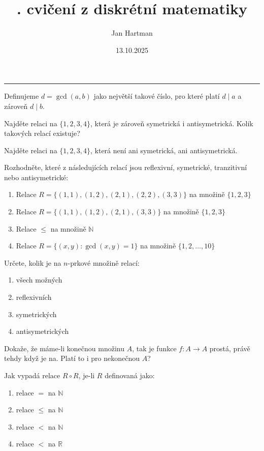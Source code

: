 \documentclass[10pt]{article}
\title{\tutnum. cvičení z diskrétní matematiky}
\author{Jan Hartman}
\date{13.10.2025}
\newcommand{\titlerule}{%
    \noindent %
    \makebox[\textwidth]{\large \thetitle \hfill \thedate}
    \rule{\textwidth}{0.4pt}%
}
\begin{document}
\titlerule

\begin{defn}
Definujeme $d = \gcd(a,b)$ jako největší takové číslo, pro které platí $d \mid a$ a zároveň $d \mid b$.
\end{defn}

\begin{problem}
Najděte relaci na $\{1,2,3,4\}$, která je zároveň symetrická i antisymetrická. Kolik takových relací existuje?
\end{problem}

\begin{problem}
Najděte relaci na $\{1,2,3,4\}$, která není ani symetrická, ani antisymetrická.
\end{problem}

\begin{problem}
Rozhodněte, které z následujících relací jsou reflexivní, symetrické, tranzitivní nebo antisymetrické:
\begin{enumerate}[label=(\alph*)]
    \item Relace $R=\{(1,1),(1,2),(2,1),(2,2),(3,3)\}$ na množině $\{1,2,3\}$
    \item Relace $R=\{(1,1),(1,2),(2,1),(3,3)\}$ na množině $\{1,2,3\}$
    \item Relace $\leq$ na množině $\mathbb{N}$
    \item Relace $R = \{ (x,y) : \gcd(x,y) = 1 \}$ na množině $\{1,2,\ldots,10\}$
\end{enumerate}
\end{problem}

\begin{problem}
Určete, kolik je na $n$-prkové množině relací:
\begin{enumerate}[label=(\alph*)]
    \item všech možných
    \item reflexivních
    \item symetrických
    \item antisymetrických
\end{enumerate}
\end{problem}

\begin{problem}
Dokaže, že máme-li konečnou množinu $A$, tak je funkce $f : A \rightarrow A$ prostá, právě tehdy když je na. Platí to i pro nekonečnou $A$?
\end{problem}

\begin{problem}
Jak vypadá relace $R \circ R$, je-li $R$ definovaná jako:
\begin{enumerate}[label=(\alph*)]
    \item relace $=$ na $\mathbb{N}$
    \item relace $\leq$ na $\mathbb{N}$
    \item relace $<$ na $\mathbb{N}$
    \item relace $<$ na $\mathbb{R}$
\end{enumerate}
\end{problem}
\end{document}
